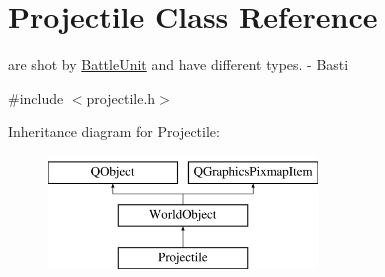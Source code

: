 \hypertarget{class_projectile}{}\section{Projectile Class Reference}
\label{class_projectile}


are shot by \hyperlink{class_battle_unit}{Battle\+Unit} and have different types. -\/ Basti  




{\ttfamily \#include $<$projectile.\+h$>$}

Inheritance diagram for Projectile\+:\begin{figure}[H]
\begin{center}
\leavevmode
\includegraphics[height=3.000000cm]{class_projectile}
\end{center}
\end{figure}
